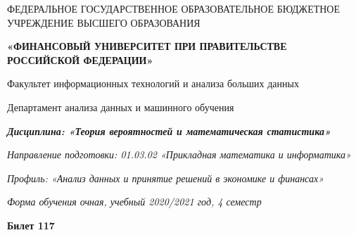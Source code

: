 \documentclass[a4paper,14pt]{article}
\begin{document}
\begin{center}
ФЕДЕРАЛЬНОЕ ГОСУДАРСТВЕННОЕ ОБРАЗОВАТЕЛЬНОЕ БЮДЖЕТНОЕ УЧРЕЖДЕНИЕ ВЫСШЕГО ОБРАЗОВАНИЯ

    \textbf{«ФИНАНСОВЫЙ УНИВЕРСИТЕТ ПРИ ПРАВИТЕЛЬСТВЕ РОССИЙСКОЙ ФЕДЕРАЦИИ»}

Факультет информационных технологий и анализа больших данных

Департамент анализа данных и машинного обучения

\textit{
	\textbf{Дисциплина: «Теория вероятностей и математическая статистика»}}

\textit{Направление подготовки: 01.03.02 «Прикладная математика и информатика»}

\textit{Профиль: «Анализ данных и принятие решений в экономике и финансах»}

\textit{Форма обучения очная, учебный 2020/2021 год, 4 семестр}

\textbf{Билет 117}

\end{center}
\end{document}

